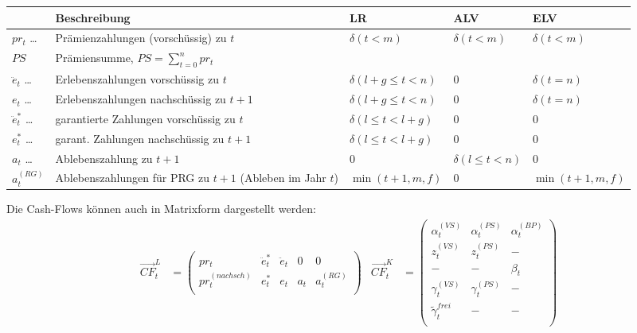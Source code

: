 \documentclass[a4paper,10pt]{article}
\begin{document}
\begin{longtable}{lp{6.5cm}v{2.5cm}v{2.5cm}v{2.5cm}}
& Beschreibung & LR & ALV & ELV \\\hline
$pr_t$  \dots          & Prämienzahlungen (vorschüssig) zu $t$ & $\delta(t<m)$ & $\delta(t<m)$ & $\delta(t<m)$ \\
$PS$                   & Prämiensumme, $PS=\sum_{t=0}^n pr_t$\\[1em]

$\ddot{e}_t$  \dots    & Erlebenszahlungen vorschüssig zu $t$ & $\delta(l+g\le t< n)$ & 0 & $\delta(t=n)$\\
$e_t$  \dots           & Erlebenszahlungen nachschüssig zu $t+1$& $\delta(l+g\le t< n)$ & 0 & $\delta(t=n)$\\
$\ddot{e}_t^{*}$ \dots & garantierte Zahlungen vorschüssig zu $t$ & $\delta(l\le t< l+g)$ & 0 & 0 \\
$e_t^{*}$  \dots       & garant. Zahlungen nachschüssig zu $t+1$ & $\delta(l\le t< l+g)$ & 0 & 0 \\[1em]

$a_t$  \dots           & Ablebenszahlung zu $t+1$ & 0 & $\delta(l\le t < n)$ & 0 \\
$a_t^{(RG)}$           & Ablebenszahlungen für PRG zu $t+1$ (Ableben im Jahr $t$) & $\min(t+1,m,f)$ & 0 & $\min(t+1,m,f)$ \\

\end{longtable}

Die Cash-Flows können auch in Matrixform dargestellt werden:
\begin{align*}
%
 \overrightarrow{CF}^L_t &= \left(
 \begin{matrix} %
pr_t & \ddot{e}_t^{*} & \ddot{e}_t & 0 & 0 \\
pr^{(nachsch)}_t & e_t^{*} & e_t & a_t & a_t^{(RG)}\\
\end{matrix}
 \right)
% 
&
 \overrightarrow{CF}^K_t &= \left(
 \begin{matrix}
\alpha^{(VS)}_t & \alpha^{(PS)}_t  & \alpha^{(BP)}_t \\
z^{(VS)}_t & z^{(PS)}_t  & -\\
- & - & \beta_t \\
\gamma^{(VS)}_t & \gamma^{(PS)}_t & -\\
\tilde{\gamma}^{frei}_t & - & -\\  
 \end{matrix}
 \right)
\end{align*}
\end{document}
